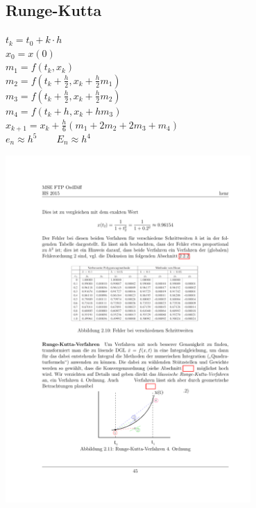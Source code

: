 \begin{minipage}{0.4\linewidth}
    
\end{minipage}
\begin{minipage}{0.6\linewidth}
    \subsection{Runge-Kutta}
    $t_k = t_0 + k \cdot h$ \\
    $x_0 = x(0)$ \\
    $m_1 = f(t_k, x_k)$\\
    $m_2 = f(t_k + \frac{h}{2}, x_k + \frac{h}{2} m_1)$ \\
    $m_3 = f(t_k + \frac{h}{2}, x_k + \frac{h}{2} m_2)$ \\
    $m_4 = f(t_k + h, x_k + hm_3)$ \\
    $x_{k+1} = x_k + \frac{h}{6} \left(m_1 + 2m_2 + 2m_3 + m_4\right)$ \\
    $e_n \approx h^5 \qquad E_n \approx h^4$
\end{minipage}
\begin{minipage}{0.4\linewidth}
	\includegraphics[width= 0.7\textwidth]{images/RK4.pdf}
\end{minipage}
